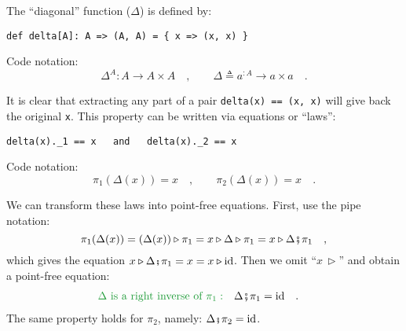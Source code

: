 The \textsf{``}diagonal\textsf{''} function ($\Delta$) is defined by:
\begin{lstlisting}
def delta[A]: A => (A, A) = { x => (x, x) }
\end{lstlisting}
Code notation:
\[
\Delta^{A}:A\rightarrow A\times A\quad,\quad\quad\Delta\triangleq a^{:A}\rightarrow a\times a\quad.
\]

It is clear that extracting any part of a pair \lstinline!delta(x) == (x, x)!
will give back the original \lstinline!x!. This property can be written
via equations or \textsf{``}laws\textsf{''}:
\begin{lstlisting}
delta(x)._1 == x   and   delta(x)._2 == x
\end{lstlisting}
Code notation:
\[
\pi_{1}(\Delta(x))=x\quad,\quad\quad\pi_{2}(\Delta(x))=x\quad.
\]

We can transform these laws into point-free equations. First, use
the pipe notation:
\[
\pi_{1}(\Delta(x))=(\Delta(x))\triangleright\pi_{1}=x\triangleright\Delta\triangleright\pi_{1}=x\triangleright\Delta\bef\pi_{1}\quad,
\]
which gives the equation $x\triangleright\Delta\bef\pi_{1}=x=x\triangleright\text{id}$.
Then we omit \textsf{``}$x\,\triangleright$\textsf{''} and obtain a point-free equation:
\begin{align}
{\color{greenunder}\Delta\text{ is a right inverse of }\pi_{1}:}\quad & \Delta\bef\pi_{1}=\text{id}\quad.\label{eq:pair-identity-law-left}
\end{align}
The same property holds for $\pi_{2}$, namely: $\Delta\bef\pi_{2}=\text{id}$.

